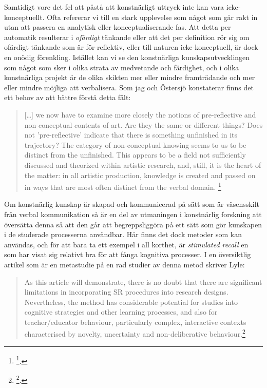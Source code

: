 \documentclass[11pt]{article}
\begin{document}
Samtidigt vore det fel att påstå att konstnärligt uttryck inte kan vara
icke-konceptuellt. Ofta refererar vi till en stark upplevelse som något
som går rakt in utan att passera en analytisk eller konceptualiserande
fas. Att detta per automatik resulterar i \emph{ofärdigt} tänkande eller att
det per definition rör sig om ofärdigt tänkande som är för-reflektiv,
eller till naturen icke-konceptuell, är dock en onödig förenkling.
Istället kan vi se den konstnärliga kunskapsutvecklingen som något som
sker i olika strata av medvetande och färdighet, och i olika
konstnärliga projekt är de olika skikten mer eller mindre framträdande
och mer eller mindre möjliga att verbalisera. Som jag och Östersjö
konstaterar finns det ett behov av att bättre förstå detta fält:

\begin{quote}
[\ldots{}] we now have to examine more closely the notions of
pre-reflective and non-conceptual contents of art. Are they the same
or different things? Does not 'pre-reflective' indicate that there is
something unfinished in its trajectory? The category of non-conceptual
knowing seems to us to be distinct from the unfinished. This appears
to be a field not sufficiently discussed and theorized within artistic
research, and, still, it is the heart of the matter: in all artistic
production, knowledge is created and passed on in ways that are most
often distinct from the verbal domain. \footnote{\footcite[s.35]{frisk-ost13}.}
\end{quote}

Om konstnärlig kunskap är skapad och kommunicerad på sätt som är
väsensskilt från verbal kommunikation så är en del av utmaningen i
konstnärlig forskning att översätta denna så att den går att
begreppsliggöra på ett sätt som gör kunskapen i de studerade processerna
användbar. Här finns det dock metoder som kan användas, och för att bara
ta ett exempel i all korthet, är \emph{stimulated recall} en som har visat
sig relativt bra för att fånga kognitiva processer. I en översiktlig
artikel som är en metastudie på en rad studier av denna metod skriver
Lyle:

\begin{quote}
As this article will demonstrate, there is no doubt that there are
significant limitations in incorporating SR procedures into research
designs. Nevertheless, the method has considerable potential for
studies into cognitive strategies and other learning processes, and
also for teacher/educator behaviour, particularly complex, interactive
contexts characterised by novelty, uncertainty and non-deliberative
behaviour.\footnote{\footcite[s.861-2]{Lyle2003}.}
\end{quote}
\end{document}
